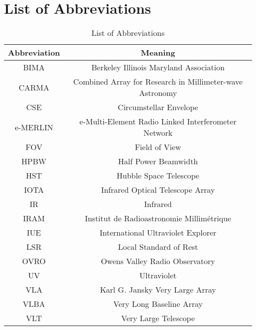 
\chapter{List of Abbreviations}
\label{app:1}

\begin{table}[!hbt]
\begin{center}
\caption[List of Abbreviations]
{List of Abbreviations}
\begin{tabular}{cc}
\hline
\hline
\rule{0pt}{2.5ex}Abbreviation & Meaning\\
\hline
BIMA & Berkeley Illinois Maryland Association \\
CARMA & Combined Array for Research in Millimeter-wave Astronomy \\
CSE & Circumstellar Envelope \\
e-MERLIN &  e-Multi-Element Radio Linked Interferometer Network \\
FOV & Field of View \\
HPBW & Half Power Beamwidth \\
HST & Hubble Space Telescope \\
IOTA & Infrared Optical Telescope Array\\
IR & Infrared \\
IRAM & Institut de Radioastronomie Millim\'etrique \\
IUE & International Ultraviolet Explorer \\
LSR & Local Standard of Rest \\
OVRO & Owens Valley Radio Observatory \\
UV & Ultraviolet \\
VLA & Karl G. Jansky Very Large Array \\
VLBA & Very Long Baseline Array \\
VLT & Very Large Telescope \\

\hline
\end{tabular}
\label{tab:6.4.1}
\end{center}
\end{table}


